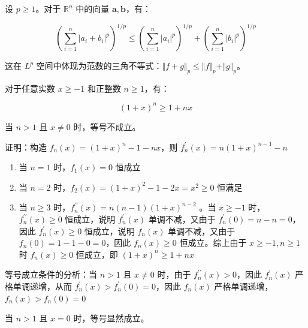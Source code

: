 \begin{theorem}

设 $\displaystyle p \ge 1$。对于 $\displaystyle \mathbb{R}^n$ 中的向量 $\boldsymbol{a}, \boldsymbol{b}$，有：

$$
\displaystyle \left( \sum_{i=1}^n \vert a_i + b_i \vert^p \right)^{1/p} \le \left( \sum_{i=1}^n \vert a_i \vert^p \right)^{1/p} + \left( \sum_{i=1}^n \vert b_i \vert^p \right)^{1/p}
$$

这在 $\displaystyle L^p$ 空间中体现为范数的三角不等式：$\displaystyle \Vert f + g \Vert_p \le \Vert f \Vert_p + \Vert g \Vert_p$。

\end{theorem}

\begin{theorem}

对于任意实数 $\displaystyle x \ge -1$ 和正整数 $\displaystyle n \ge 1$，有：

$$
\displaystyle (1 + x)^n \ge 1 + nx
$$

当 $\displaystyle n > 1$ 且 $\displaystyle x \ne 0$ 时，等号不成立。

\end{theorem}

证明：构造 $f_n(x) = (1+x)^n - 1 - nx$，则 $f_n^\prime(x) = n(1+x)^{n-1} - n$

\begin{enumerate}
  \item {当 $n=1$ 时，$f_1(x) = 0$ 恒成立

}\item {当 $n=2$ 时，$f_2(x) = (1+x)^2 - 1 - 2x = x^2 \geq 0$ 恒满足

}\item {当 $n \geq 3$ 时，$f_n^{\prime\prime}(x) = n(n-1)(1+x)^{n-2}$ 。当 $x \geq -1$ 时，$f_n^{\prime\prime}(x) \geq 0$ 恒成立，说明 $f_n^\prime(x)$ 单调不减，又由于 $f_n^\prime(0) = n - n = 0$，因此 $f_n^\prime(x) \geq 0$ 恒成立，说明 $f_n(x)$ 单调不减，又由于 $f_n(0) = 1 - 1 - 0 = 0$，因此 $f_n(x) \geq 0$ 恒成立。综上由于 $x \geq -1, n \geq 1$ 时 $f_n(x) \geq 0$ 恒成立，即 $(1+x)^n \geq 1+nx$

}
\end{enumerate}

等号成立条件的分析：当 $n > 1$ 且 $x \neq 0$ 时，由于 $f_n^{\prime\prime}(x) > 0$，因此 $f_n^\prime(x)$ 严格单调递增，从而 $f_n^\prime(x) > f^\prime_n(0) =0$，因此 $f_n(x)$ 严格单调递增，$f_n(x) > f_n(0)= 0$

当 $n > 1$ 且 $x = 0$ 时，等号显然成立。

